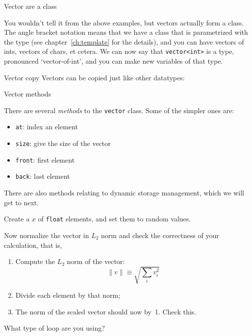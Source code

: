  {Vector are a class}
\label{sec:stdvector}

You wouldn't tell it from the above examples, but vectors actually
form a  class. The angle bracket notation means
that we have a class that is parametrized with the type (see
chapter~\ref{ch:template} for the details), and you can
have vectors of ints, vectors of chars, et cetera. We can now say that
\lstinline{vector<int>} is a type, pronounced `vector-of-int', and you can
make new variables of that type.

\begin{block}{Vector copy}
  \label{sl:vectorcopy}
  Vectors can be copied just like other datatypes:
\end{block}

 {Vector methods}

There are several \emph{methods}
to the \lstinline{vector} class. Some of the simpler ones are:
\begin{itemize}
\item \lstinline{at}: index an element
\item \lstinline{size}: give the size of the vector
\item \lstinline{front}: first element
\item \lstinline{back}: last element
\end{itemize}

There are also methods relating to dynamic storage management, which
we will get to next.

\begin{exercise}
  \label{ex:vectornormalize}
  Create a  $x$ of \lstinline{float} elements, and set them to random
  values.

  Now normalize the vector in $L_2$ norm and check the correctness of
  your calculation, that is,
  \begin{enumerate}
  \item Compute the $L_2$ norm of the vector:
    \[ \| v\| \equiv \sqrt{\sum_iv_i^2} \]
  \item Divide each element by that norm;
  \item The norm of the scaled vector should now by~1. Check this.
  \end{enumerate}
  What type of loop are you using?
\end{exercise}

